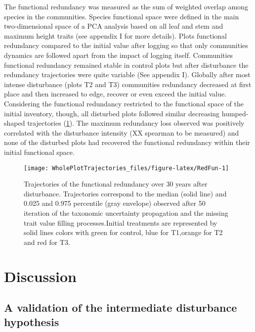 \documentclass[fleqn,10pt]{ArtEcoFoG} %
\theoremstyle{definition}
\theoremstyle{definition}
\theoremstyle{definition}
\theoremstyle{remark}
\begin{document}
The functional redundancy was measured as the sum of weighted overlap
among species in the communities. Species functional space were defined
in the main two-dimensional space of a PCA analysis based on all leaf
and stem and maximum height traits (see appendix I for more details).
Plots functional redundancy compared to the initial value after logging
so that only communities dynamics are followed apart from the impact of
logging itself. Communities functional redundancy remained stable in
control plots but after disturbance the redundancy trajectories were
quite variable (See appendix I). Globally after most intense disturbance
(plots T2 and T3) communities redundancy decreased at first place and
then increased to edge, recover or even exceed the initial value.
Considering the functional redundancy restricted to the functional space
of the initial inventory, though, all disturbed plots followed similar
decreasing humped-shaped trajectories (\ref{fig:RedFun}). The maximum
redundancy loss observed was positively correlated with the disturbance
intensity (XX spearman to be measured) and none of the disturbed plots
had recovered the functional redundancy within their initial functional
space.

\begin{figure}

{\centering \texttt{[image: WholePlotTrajectories\_files/figure-latex/RedFun-1]} 

}

\caption{Trajectories of the functional redundancy over 30 years after disturbance. Trajectories correspond to the median (solid line) and 0.025 and 0.975 percentile (gray envelope) observed after 50 iteration of the taxonomic uncertainty propagation and the missing trait value filling processes.Initial treatments are represented by solid lines colors with green for control, blue for T1,orange for T2 and red for T3.}\label{fig:RedFun}
\end{figure}

\section{Discussion}\label{discussion}

\subsection{A validation of the intermediate disturbance
hypothesis}\label{a-validation-of-the-intermediate-disturbance-hypothesis}
\end{document}
